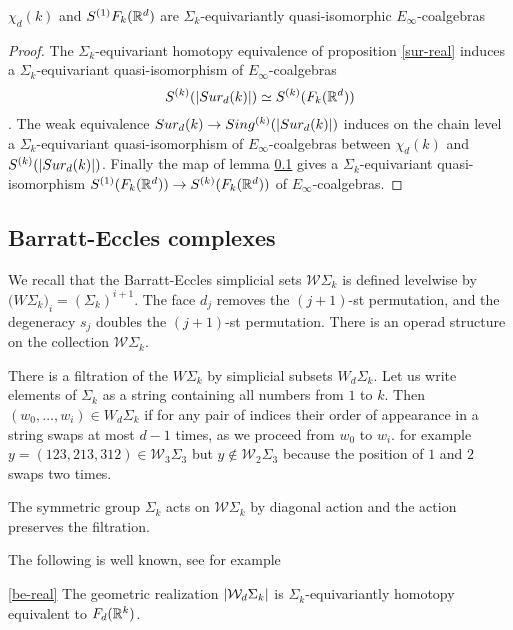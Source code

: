 \begin{proposition}\label{sur-model}
$\chi_d(k)$ and $S^{(1)}{F_k(\mathbb{R}^d)}$ are $\Sigma_k$-equivariantly quasi-isomorphic $E_\infty$-coalgebras 
\end{proposition}
\begin{proof}
The $\Sigma_k$-equivariant homotopy equivalence of proposition \ref{sur-real} induces a $\Sigma_k$-equivariant  quasi-isomorphism of $E_{\infty}$-coalgebras  
$$S^{(k)}(\lvert Sur_d(k)\rvert) \simeq S^{(k)}(F_k(\mathbb{R}^d))$$.   The weak equivalence %
$Sur_d(k) \to Sing^{(k)}(\lvert Sur_d(k)\rvert)$ induces on the chain level a $\Sigma_k$-equivariant  quasi-isomorphism of 
$E_\infty$-coalgebras
between $\chi_d(k)$
and $S^{(k)}(\lvert Sur_d(k)\rvert)$. Finally the map of lemma \ref{} gives a $\Sigma_k$-equivariant quasi-isomorphism $S^{(1)}(F_k(\mathbb{R}^d)) \to S^{(k)}(F_k(\mathbb{R}^d))$ of $E_\infty$-coalgebras.
\end{proof}


\subsection{Barratt-Eccles complexes}

We recall that the Barratt-Eccles simplicial sets $\mathcal{W}\Sigma_k$ is defined levelwise by
$\mathcal({W}\Sigma_k)_i=(\Sigma_k)^{i+1}$. The face $d_{j}$ removes the $(j+1)$-st permutation, and the degeneracy $s_j$ doubles the $(j+1)$-st permutation. There is an operad structure on the collection $\mathcal{W} \Sigma_k$. 

There is a filtration of the $W \Sigma_k$ by simplicial subsets
$W_d \Sigma_k$. Let us write elements of $\Sigma_k$ as a string containing all numbers from $1$ to $k$. Then 
$(w_0,\dots,w_i) \in W_d \Sigma_k$ if for any pair of indices their order of appearance in a string swaps at most $d-1$ times, as we proceed from $w_0$ to $w_i$. for example $y=(123,213,312) \in 
\mathcal{W}_3 \Sigma_3$ but $y \notin \mathcal{W}_2 \Sigma_3$
because the position of $1$ and $2$ swaps two times.

The symmetric group $\Sigma_k$ acts on 
$\mathcal{W} \Sigma_k$ by diagonal action and the action preserves the filtration.


The following is well known, see for example \cite{BF}
\begin{proposition} \ref{be-real}
The geometric realization $\lvert\mathcal{W}_d \Sigma_k\rvert$ is $\Sigma_k$-equivariantly homotopy equivalent to $F_d(\mathbb{R}^k)$.
\end{proposition}


